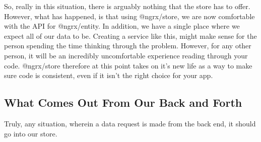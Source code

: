 So, really in this situation, there is arguably nothing that the store has to
offer. However, what has happened, is that using @ngrx/store, we are now
comfortable with the API for @ngrx/entity. In addition, we have a single place
where we expect all of our data to be. Creating a service like this, might make
sense for the person spending the time thinking through the problem. However,
for any other person, it will be an incredibly uncomfortable experience reading
through your code. @ngrx/store therefore at this point takes on it's new life
as a way to make sure code is consistent, even if it isn't the right choice for
your app.

\subsection{ What Comes Out From Our Back and Forth }
Truly, any situation, wherein a data request is made from the back end, it
should go into our store.
